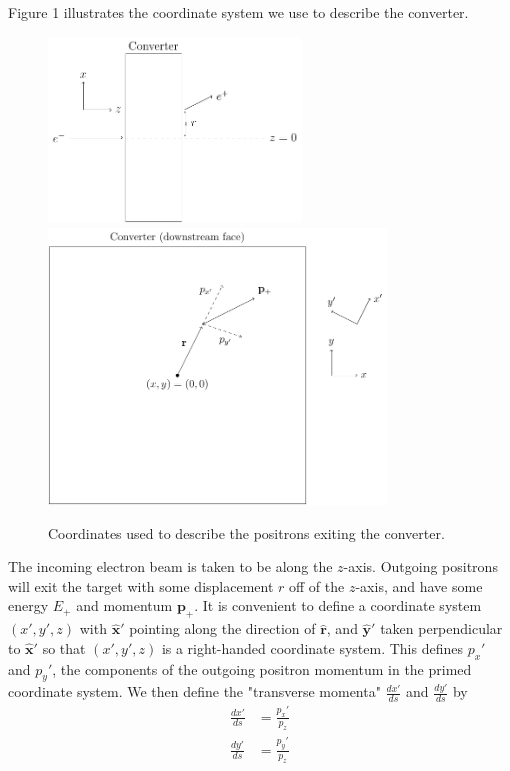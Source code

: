 \documentclass[12pt]{article}
\newcommand{\pp}{\mathbf{p}}
\newcommand{\xx}{\mathbf{\hat{x}}}
\newcommand{\yy}{\mathbf{\hat{y}}}
\newcommand{\rr}{\mathbf{\hat{r}}}
\begin{document}
Figure 1 illustrates the coordinate system we use to describe the converter.
\begin{figure}
\centering
\includegraphics[width=0.6\textwidth]{coords1.pdf}
\includegraphics[width=0.8\textwidth]{coords2.pdf}
\caption{Coordinates used to describe the positrons exiting the converter.}
\end{figure}
The incoming electron beam is taken to be along the $z$-axis.
Outgoing positrons will exit the target with some displacement $r$ off of the $z$-axis, and have some energy $E_+$ and momentum $\pp_+$.
It is convenient to define a coordinate system $(x', y', z)$ with $\xx'$ pointing along the direction of $\rr$, and $\yy'$ taken perpendicular to $\xx'$ so that $(x', y', z)$ is a right-handed coordinate system.
This defines $p_x'$ and $p_y'$, the components of the outgoing positron momentum in the primed coordinate system.
We then define the "transverse momenta" $\frac{dx'}{ds}$ and $\frac{dy'}{ds}$ by
\begin{align*}
\frac{dx'}{ds} & = \frac{p_x'}{p_z} \\
\frac{dy'}{ds} & = \frac{p_y'}{p_z}
\end{align*}
\end{document}
